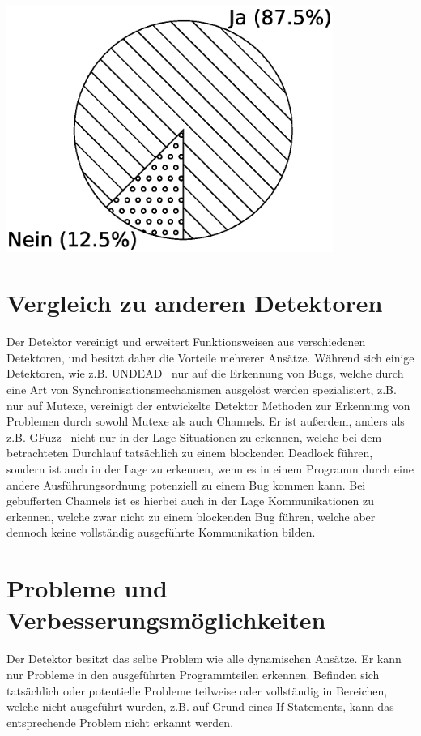 \hfill
\begin{minipage}{0.45\textwidth}
  \centering
  \includegraphics[width=0.8\textwidth]{img/pi_goker_mix.eps}
  \label{Chap:Eval-Sec:Goker-Fig:Mix}
\end{minipage}

\section{Vergleich zu anderen Detektoren}
Der Detektor vereinigt und erweitert Funktionsweisen aus verschiedenen 
Detektoren, und besitzt daher die Vorteile mehrerer Ansätze. Während sich 
einige Detektoren, wie z.B. UNDEAD~\cite{Undead} nur auf die Erkennung 
von Bugs, welche durch eine Art von Synchronisationsmechanismen ausgelöst werden 
spezialisiert, z.B. nur auf Mutexe,
vereinigt der entwickelte Detektor Methoden zur Erkennung von Problemen 
durch sowohl Mutexe als auch Channels. Er ist außerdem, anders als z.B. 
GFuzz~\cite{gfuzz} nicht nur in der Lage Situationen zu erkennen, welche 
bei dem betrachteten Durchlauf tatsächlich zu einem blockenden 
Deadlock führen, sondern ist auch in der Lage zu erkennen, wenn es in einem 
Programm durch eine andere Ausführungsordnung potenziell zu einem 
Bug kommen kann. Bei gebufferten Channels ist es hierbei auch in der Lage
Kommunikationen zu erkennen, welche zwar nicht zu einem blockenden 
Bug führen, welche aber dennoch keine vollständig ausgeführte Kommunikation 
bilden. 

\section{Probleme und Verbesserungsmöglichkeiten}
Der Detektor besitzt das selbe Problem wie alle dynamischen Ansätze. Er 
kann nur Probleme in den ausgeführten Programmteilen erkennen. Befinden sich 
tatsächlich oder potentielle Probleme teilweise oder vollständig in Bereichen, 
welche nicht ausgeführt wurden, z.B. auf Grund eines If-Statements, 
kann das entsprechende Problem nicht erkannt werden.


